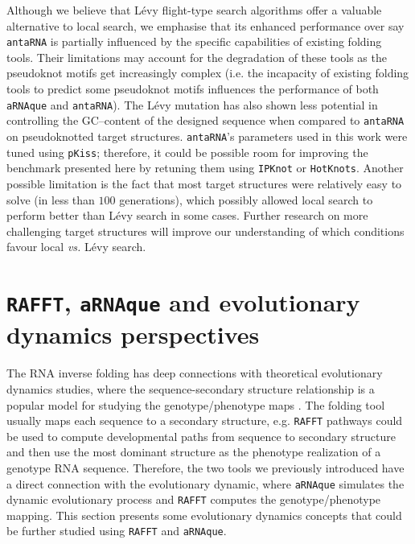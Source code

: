Although we believe that Lévy flight-type search algorithms offer a valuable alternative to local search, we emphasise that its enhanced performance over say \texttt{antaRNA} is partially influenced by the specific capabilities of existing folding tools. Their limitations may account for the degradation of these tools as the pseudoknot motifs get increasingly complex (i.e. the incapacity of existing folding tools to predict some pseudoknot motifs influences the performance of both \texttt{aRNAque} and \texttt{antaRNA}). The Lévy mutation has also shown less potential in controlling the GC--content of the designed sequence when compared to \texttt{antaRNA} on pseudoknotted target structures. \texttt{antaRNA}'s parameters used in this work were tuned using \texttt{pKiss}; therefore, it could be possible room for improving the benchmark presented here by retuning them using \texttt{IPKnot} or \texttt{HotKnots}.  Another possible limitation is the fact that most target structures were relatively easy to solve (in less than $100$ generations), which possibly allowed local search to perform better than Lévy search in some cases. Further research on more challenging target structures will improve our understanding of which conditions favour local \emph{vs.} Lévy search.


\section{\texttt{RAFFT}, \texttt{aRNAque} and evolutionary dynamics perspectives}\label{sec:evolution}

The \ac{RNA} inverse folding has deep connections with theoretical evolutionary dynamics studies, where the sequence-secondary structure relationship is a popular model for studying the genotype/phenotype maps \cite{greenbury2016genetic,jaeger2001tectorna}. The folding tool usually maps each sequence to a secondary structure, e.g. \texttt{RAFFT} pathways could be used to compute developmental paths from sequence to secondary structure and then use the most dominant structure as the phenotype realization of a genotype \ac{RNA} sequence. Therefore, the two tools we previously introduced have a direct connection with the evolutionary dynamic, where \texttt{aRNAque} simulates the dynamic evolutionary process and \texttt{RAFFT} computes the genotype/phenotype mapping. This section presents some evolutionary dynamics concepts that could be further studied using \texttt{RAFFT} and \texttt{aRNAque}. 


